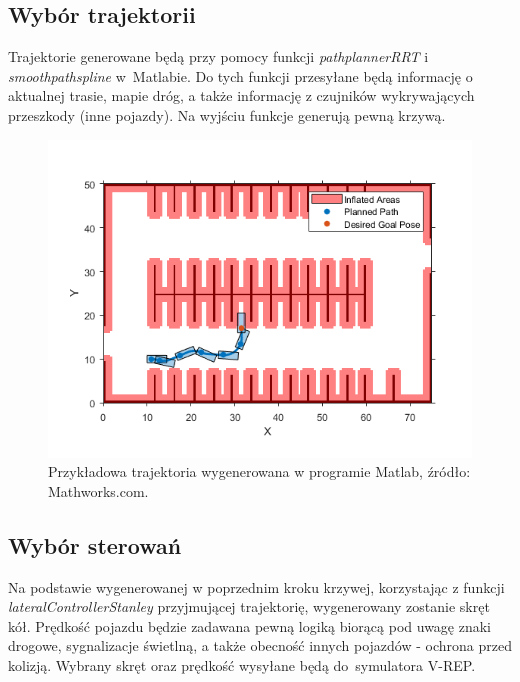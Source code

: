 \subsection{Wybór trajektorii}

Trajektorie generowane będą przy pomocy funkcji \textit{pathplannerRRT} i \textit{smoothpathspline} w~Matlabie. Do tych funkcji przesyłane będą informację o aktualnej trasie, mapie dróg, a także informację z czujników wykrywających przeszkody (inne pojazdy). Na wyjściu funkcje generują pewną krzywą.

\begin{figure}[!h]
	\centering
	\includegraphics[width=.8\linewidth]{trajektoria.png}
	\caption{Przykładowa trajektoria wygenerowana w programie Matlab, źródło: Mathworks.com.}
	\label{fig:trajektoria}
\end{figure}

\subsection{Wybór sterowań}

Na podstawie wygenerowanej w poprzednim kroku krzywej, korzystając z funkcji \textit{lateralControllerStanley} przyjmującej trajektorię, wygenerowany zostanie skręt kół. Prędkość pojazdu będzie zadawana pewną logiką biorącą pod uwagę znaki drogowe, sygnalizacje świetlną, a także obecność innych pojazdów - ochrona przed kolizją. Wybrany skręt oraz prędkość wysyłane będą do~symulatora V-REP.
 
